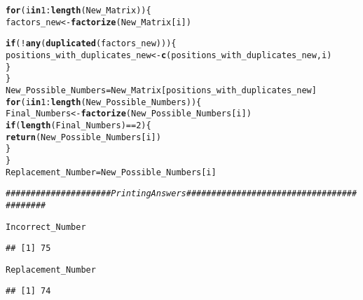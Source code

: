 \documentclass{article}\usepackage[]{graphicx}\usepackage[]{xcolor}
\makeatletter
\newcommand{\hlnum}[1]{\textcolor[rgb]{0.686,0.059,0.569}{#1}}%
\newcommand{\hlcom}[1]{\textcolor[rgb]{0.678,0.584,0.686}{\textit{#1}}}%
\newcommand{\hlopt}[1]{\textcolor[rgb]{0,0,0}{#1}}%
\newcommand{\hldef}[1]{\textcolor[rgb]{0.345,0.345,0.345}{#1}}%
\newcommand{\hlkwa}[1]{\textcolor[rgb]{0.161,0.373,0.58}{\textbf{#1}}}%
\newcommand{\hlkwb}[1]{\textcolor[rgb]{0.69,0.353,0.396}{#1}}%
\newcommand{\hlkwd}[1]{\textcolor[rgb]{0.737,0.353,0.396}{\textbf{#1}}}%
\newenvironment{kframe}{%
 \def\at@end@of@kframe{}%
 \ifinner\ifhmode%
  \def\at@end@of@kframe{\end{minipage}}%
  \begin{minipage}{\columnwidth}%
 \fi\fi%
 \def\FrameCommand##1{\hskip\@totalleftmargin \hskip-\fboxsep
 \colorbox{shadecolor}{##1}\hskip-\fboxsep
     \hskip-\linewidth \hskip-\@totalleftmargin \hskip\columnwidth}%
 \MakeFramed {\advance\hsize-\width
   \@totalleftmargin\z@ \linewidth\hsize
   \@setminipage}}%
 {\par\unskip\endMakeFramed%
 \at@end@of@kframe}
\newenvironment{knitrout}{}{} %
\makeatother
\begin{document}
\begin{enumerate}
\begin{knitrout}
\begin{kframe}
\begin{alltt}
\hlkwa{for} \hldef{(i} \hlkwa{in} \hlnum{1}\hlopt{:}\hlkwd{length}\hldef{(New_Matrix)) \{}
  \hldef{factors_new} \hlkwb{<-} \hlkwd{factorize}\hldef{(New_Matrix[i])}

  \hlkwa{if} \hldef{(}\hlopt{!}\hlkwd{any}\hldef{(}\hlkwd{duplicated}\hldef{(factors_new))) \{}
    \hldef{positions_with_duplicates_new} \hlkwb{<-} \hlkwd{c}\hldef{(positions_with_duplicates_new, i)}
  \hldef{\}}
\hldef{\}}
\hldef{New_Possible_Numbers} \hlkwb{=} \hldef{New_Matrix[positions_with_duplicates_new]}
\hlkwa{for} \hldef{(i} \hlkwa{in} \hlnum{1}\hlopt{:}\hlkwd{length}\hldef{(New_Possible_Numbers)) \{}
  \hldef{Final_Numbers} \hlkwb{<-} \hlkwd{factorize}\hldef{(New_Possible_Numbers[i])}
  \hlkwa{if} \hldef{(}\hlkwd{length}\hldef{(Final_Numbers)} \hlopt{==} \hlnum{2}\hldef{) \{}
    \hlkwd{return}\hldef{(New_Possible_Numbers[i])}
  \hldef{\}}
\hldef{\}}
\hldef{Replacement_Number} \hlkwb{=} \hldef{New_Possible_Numbers[i]}

\hlcom{#####################Printing Answers##########################################}

\hldef{Incorrect_Number}
\end{alltt}
\begin{verbatim}
## [1] 75
\end{verbatim}
\begin{alltt}
\hldef{Replacement_Number}
\end{alltt}
\begin{verbatim}
## [1] 74
\end{verbatim}
\end{kframe}
\end{knitrout}
\nocite{gmp}

\end{enumerate}


\end{document}

